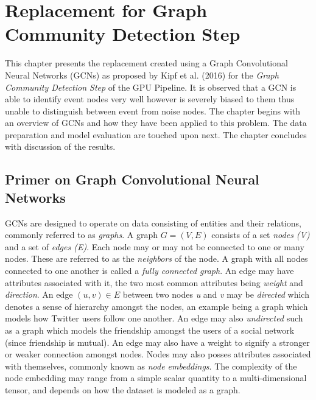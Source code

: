 
\chapter{Replacement for Graph Community Detection Step} %
\label{cha:gcn}
% 

This chapter presents the replacement created using a Graph
Convolutional Neural Networks (GCNs) as proposed by Kipf et al. (2016)
for the \emph{Graph Community Detection Step} of the GPU Pipeline. It
is observed that a GCN is able to identify event nodes very well
however is severely biased to them thus unable to distinguish between
event from noise nodes. The chapter begins with an overview of GCNs
and how they have been applied to this problem. The data preparation
and model evaluation are touched upon next. The chapter concludes with
discussion of the results.

\section{Primer on Graph Convolutional Neural Networks}
\label{sec:gcn-primer}

GCNs are designed to operate on data consisting of entities and their
relations, commonly referred to as \emph{graphs}. A graph $G = (V, E)$
consists of a set \emph{nodes (V)} and a set of \emph{edges (E)}. Each
node may or may not be connected to one or many nodes. These are
referred to as the \emph{neighbors} of the node. A graph with all
nodes connected to one another is called a \emph{fully connected
graph}. An edge may have attributes associated with it, the two most
common attributes being \emph{weight} and \emph{direction}. An edge
$(u, v) \in E$ between two nodes \emph{u} and \emph{v} may be
\emph{directed} which denotes a sense of hierarchy amongst the nodes,
an example being a graph which models how Twitter users follow one
another. An edge may also \emph{undirected} such as a graph which
models the friendship amongst the users of a social network (since
friendship is mutual). An edge may also have a weight to signify a
stronger or weaker connection amongst nodes. Nodes may also posses
attributes associated with themselves, commonly known as \emph{node
embeddings}. The complexity of the node embedding may range from a
simple scalar quantity to a multi-dimensional tensor, and depends on
how the dataset is modeled as a graph.

